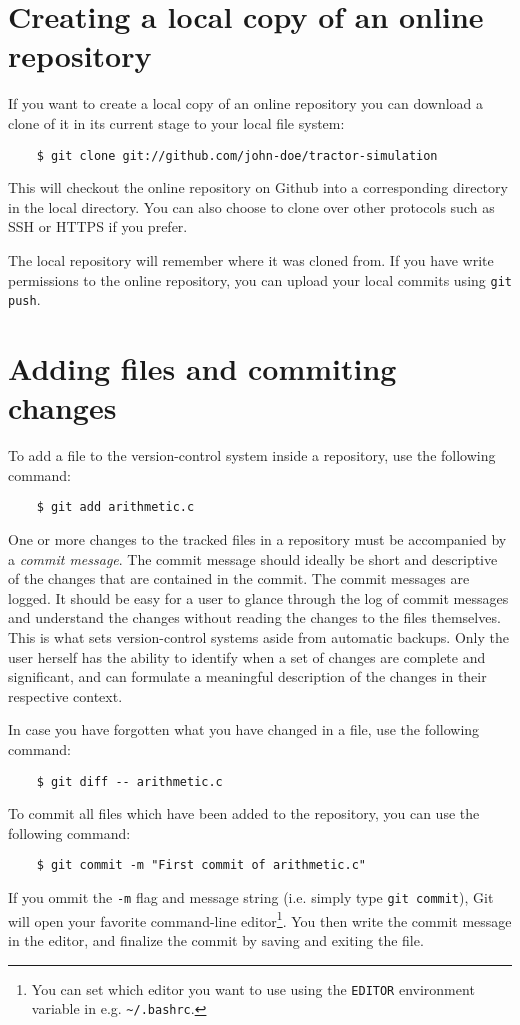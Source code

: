 \documentclass[11pt]{article}
\begin{document}
\section{Creating a local copy of an online repository}
If you want to create a local copy of an online repository you can download a 
clone of it in its current stage to your local file system:
\begin{lstlisting}
    $ git clone git://github.com/john-doe/tractor-simulation
\end{lstlisting}
This will checkout the online repository on Github into a corresponding 
directory in the local directory.  You can also choose to clone over other 
protocols such as SSH or HTTPS if you prefer.

The local repository will remember where it was cloned from.  If you have write 
permissions to the online repository, you can upload your local commits using 
\texttt{git push}.

\section{Adding files and commiting changes}
To add a file to the version-control system inside a repository, use the 
following command:
\begin{lstlisting}
    $ git add arithmetic.c
\end{lstlisting}

One or more changes to the tracked files in a repository must be accompanied by 
a \emph{commit message}.  The commit message should ideally be short and 
descriptive of the changes that are contained in the commit.  The commit 
messages are logged.  It should be easy for a user to glance through the log of 
commit messages and understand the changes without reading the changes to the 
files themselves.  This is what sets version-control systems aside from 
automatic backups.  Only the user herself has the ability to identify when a set 
of changes are complete and significant, and can formulate a meaningful 
description of the changes in their respective context.

In case you have forgotten what you have changed in a file, use the following 
command:
\begin{lstlisting}
    $ git diff -- arithmetic.c
\end{lstlisting}

To commit all files which have been added to the repository, you can use the 
following command:
\begin{lstlisting}
    $ git commit -m "First commit of arithmetic.c"
\end{lstlisting}
If you ommit the \texttt{-m} flag and message string (i.e. simply type 
\texttt{git commit}), Git will open your favorite command-line 
editor\footnote{You can set which editor you want to use using the 
    \texttt{EDITOR} environment variable in e.g.  
    \texttt{\textasciitilde/.bashrc}.}.  You then write the commit message in 
the editor, and finalize the commit by saving and exiting the file.
\end{document}
